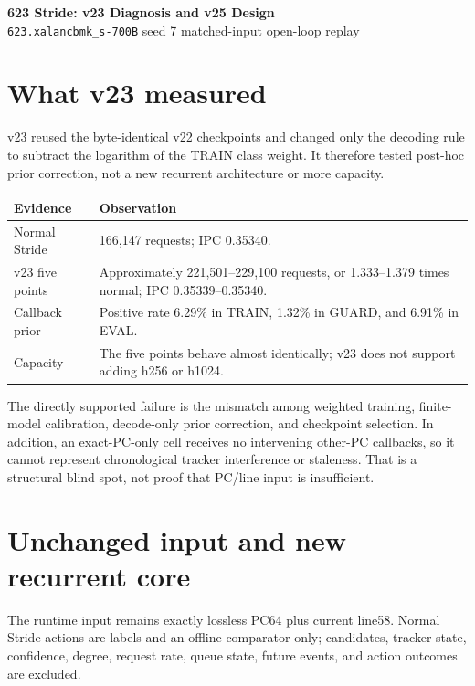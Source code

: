 \documentclass[10pt]{article}
\begin{document}
\begin{center}
{\LARGE\bfseries\color{navy} 623 Stride: v23 Diagnosis and v25 Design}\\[3pt]
{\small \texttt{623.xalancbmk\_s-700B} \quad seed 7 \quad matched-input open-loop replay}
\end{center}


\section*{What v23 measured}
v23 reused the byte-identical v22 checkpoints and changed only the decoding
rule to subtract the logarithm of the TRAIN class weight.  It therefore tested
post-hoc prior correction, not a new recurrent architecture or more capacity.

\begin{tabularx}{\linewidth}{@{}lX@{}}
\toprule
Evidence & Observation \\
\midrule
Normal Stride & 166,147 requests; IPC 0.35340. \\
v23 five points & Approximately 221,501--229,100 requests, or 1.333--1.379
times normal; IPC 0.35339--0.35340. \\
Callback prior & Positive rate 6.29\% in TRAIN, 1.32\% in GUARD, and 6.91\%
in EVAL. \\
Capacity & The five points behave almost identically; v23 does not support
adding h256 or h1024. \\
\bottomrule
\end{tabularx}

The directly supported failure is the mismatch among weighted training,
finite-model calibration, decode-only prior correction, and checkpoint
selection.  In addition, an exact-PC-only cell receives no intervening
other-PC callbacks, so it cannot represent chronological tracker interference
or staleness.  That is a structural blind spot, not proof that PC/line input is
insufficient.

\section*{Unchanged input and new recurrent core}
The runtime input remains exactly lossless PC64 plus current line58.  Normal
Stride actions are labels and an offline comparator only; candidates, tracker
state, confidence, degree, request rate, queue state, future events, and action
outcomes are excluded.
\end{document}
